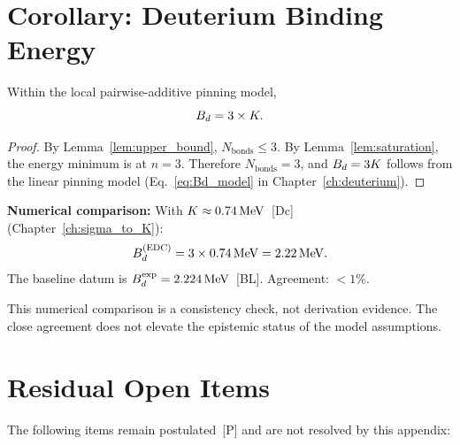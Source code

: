 \section{Corollary: Deuterium Binding Energy}

\begin{corollary}[Binding Energy of the A=2 System]
\label{cor:Bd}
Within the local pairwise-additive pinning model,
\begin{equation}
    B_d = 3 \times K.
    \label{eq:Bd_derived}
\end{equation}
\end{corollary}

\begin{proof}
By Lemma~\ref{lem:upper_bound}, $N_{\text{bonds}} \leq 3$.
By Lemma~\ref{lem:saturation}, the energy minimum is at $n = 3$.
Therefore $N_{\text{bonds}} = 3$, and $B_d = 3K$ follows from the
linear pinning model (Eq.~\ref{eq:Bd_model} in Chapter~\ref{ch:deuterium}).
\end{proof}

\textbf{Numerical comparison:}
With $K \approx 0.74\,\mathrm{MeV}$~[Dc] (Chapter~\ref{ch:sigma_to_K}):
\begin{equation}
    B_d^{\text{(EDC)}} = 3 \times 0.74\,\mathrm{MeV} = 2.22\,\mathrm{MeV}.
\end{equation}
The baseline datum is $B_d^{\text{exp}} = 2.224\,\mathrm{MeV}$~[BL]. Agreement: $< 1\%$.

This numerical comparison is a consistency check, not derivation evidence.
The close agreement does not elevate the epistemic status of the model
assumptions.

\section{Residual Open Items}

The following items remain postulated~[P] and are not resolved by this
appendix:

